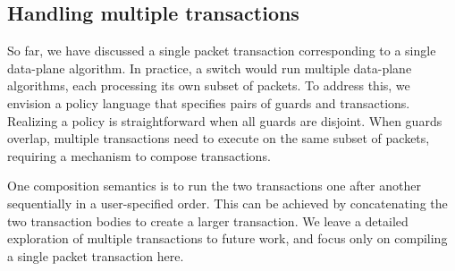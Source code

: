 \subsection{Handling multiple transactions}
\label{ss:multiple}
So far, we have discussed a single packet transaction corresponding to a single
data-plane algorithm. In practice, a switch would run multiple data-plane
algorithms, each processing its own subset of packets. To address this, we
envision a policy language that specifies pairs of guards and transactions.
Realizing a policy is straightforward when all guards are disjoint. When guards
overlap, multiple transactions need to execute on the same subset of packets,
requiring a mechanism to compose transactions.

One composition semantics is to run the two transactions one after another
sequentially in a user-specified order. This can be achieved by concatenating
the two transaction bodies to create a larger transaction.  We leave a detailed
exploration of multiple transactions to future work, and focus only on
compiling a single packet transaction here.
